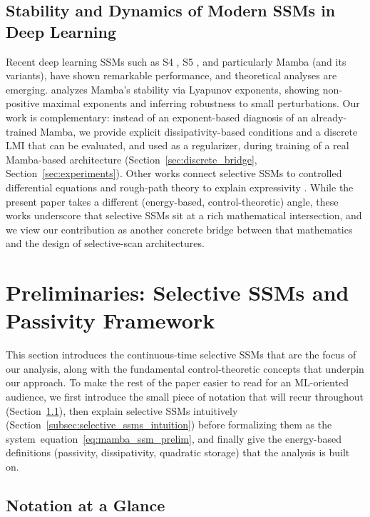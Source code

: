 \documentclass[10pt]{article} %
\def\eqref#1{equation~\ref{#1}}
\theoremstyle{definition}
\begin{document}
\subsection{Stability and Dynamics of Modern SSMs in Deep Learning}
Recent deep learning SSMs such as S4 \citep{gu2022efficiently}, S5 \citep{smith2023simplified}, and particularly Mamba \citep{gu2024mamba} (and its variants), have shown remarkable performance, and theoretical analyses are emerging. \citet{halloran2024mamba} analyzes Mamba's stability via Lyapunov exponents, showing non-positive maximal exponents and inferring robustness to small perturbations. Our work is complementary: instead of an exponent-based diagnosis of an already-trained Mamba, we provide explicit dissipativity-based conditions and a discrete LMI that can be evaluated, and used as a regularizer, during training of a real Mamba-based architecture (Section~\ref{sec:discrete_bridge}, Section~\ref{sec:experiments}). Other works connect selective SSMs to controlled differential equations and rough-path theory to explain expressivity \citep{kidger2020neural, lyons2014rough, cirone2024theoretical, zubic2025limits, zubic2026expressive}. While the present paper takes a different (energy-based, control-theoretic) angle, these works underscore that selective SSMs sit at a rich mathematical intersection, and we view our contribution as another concrete bridge between that mathematics and the design of selective-scan architectures.

\section{Preliminaries: Selective SSMs and Passivity Framework}
\label{sec:preliminaries}
This section introduces the continuous-time selective SSMs that are the focus of our analysis, along with the fundamental control-theoretic concepts that underpin our approach. To make the rest of the paper easier to read for an ML-oriented audience, we first introduce the small piece of notation that will recur throughout (Section~\ref{subsec:notation_table}), then explain selective SSMs intuitively (Section~\ref{subsec:selective_ssms_intuition}) before formalizing them as the system~\eqref{eq:mamba_ssm_prelim}, and finally give the energy-based definitions (passivity, dissipativity, quadratic storage) that the analysis is built on.

\subsection{Notation at a Glance}
\label{subsec:notation_table}
\end{document}
